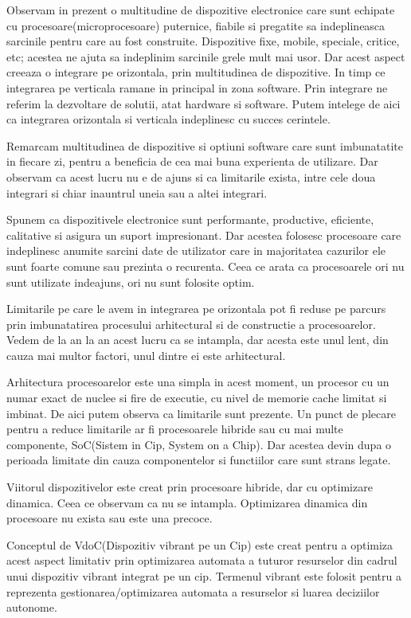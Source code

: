 \setlength{\parindent}{0.8cm}

Observam in prezent o multitudine de dispozitive electronice care sunt echipate
cu procesoare(microprocesoare) puternice, fiabile si pregatite sa indeplineasca 
sarcinile pentru care au fost construite. Dispozitive fixe, mobile, 
speciale, critice, etc; acestea ne ajuta sa indeplinim sarcinile grele mult 
mai usor. Dar acest aspect creeaza o integrare pe orizontala, prin multitudinea 
de dispozitive. In timp ce integrarea pe verticala ramane in principal in zona 
software. Prin integrare ne referim la dezvoltare de solutii, atat hardware 
si software. Putem intelege de aici ca integrarea orizontala si verticala 
indeplinesc cu succes cerintele.

Remarcam multitudinea de dispozitive si optiuni software care sunt imbunatatite 
in fiecare zi, pentru a beneficia de cea mai buna experienta de utilizare.
Dar observam ca acest lucru nu e de ajuns si ca limitarile exista, intre 
cele doua integrari si chiar inauntrul uneia sau a altei integrari.

Spunem ca dispozitivele electronice sunt performante, productive, eficiente,
calitative si asigura un suport impresionant. Dar acestea folosesc procesoare
care indeplinesc anumite sarcini date de utilizator care in majoritatea cazurilor
ele sunt foarte comune sau prezinta o recurenta. Ceea ce arata ca procesoarele 
ori nu sunt utilizate indeajuns, ori nu sunt folosite optim.

Limitarile pe care le avem in integrarea pe orizontala pot fi reduse pe parcurs
prin imbunatatirea procesului arhitectural si de constructie a procesoarelor.
Vedem de la an la an acest lucru ca se intampla, dar acesta este unul lent,
din cauza mai multor factori, unul dintre ei este arhitectural.

Arhitectura procesoarelor este una simpla in acest moment, un procesor cu un
numar exact de nuclee si fire de executie, cu nivel de memorie cache limitat
si imbinat. De aici putem observa ca limitarile sunt prezente. Un punct de plecare
pentru a reduce limitarile ar fi procesoarele hibride sau cu mai multe componente, 
SoC(Sistem in Cip, System on a Chip). Dar acestea devin dupa o perioada limitate 
din cauza componentelor si functiilor care sunt strans legate.

Viitorul dispozitivelor este creat prin procesoare hibride, dar cu optimizare 
dinamica. Ceea ce observam ca nu se intampla. Optimizarea dinamica din procesoare
nu exista sau este una precoce.

Conceptul de VdoC(Dispozitiv vibrant pe un Cip) este creat pentru a optimiza
acest aspect limitativ prin optimizarea automata a tuturor resurselor din cadrul
unui dispozitiv vibrant integrat pe un cip. Termenul vibrant este folosit pentru 
a reprezenta gestionarea/optimizarea automata a resurselor si luarea deciziilor
autonome.

